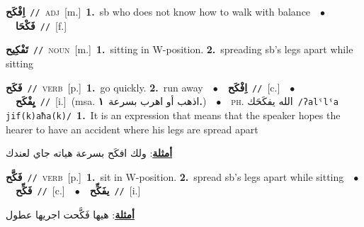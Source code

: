 \documentclass[10pt,a4paper,twoside]{article} %
\begin{document}
\begin{multicols}{2}
{\setlength\topsep{0pt}\textbf{\foreignlanguage{arabic}{اِفْكَح}}\ {\color{gray}\texttt{//}\color{black}}\ \textsc{adj}\ [m.]\ \textbf{1.}~sb who does not know how to walk with balance\ \ $\bullet$\ \ \setlength\topsep{0pt}\textbf{\foreignlanguage{arabic}{فَكْحَا}}\ {\color{gray}\texttt{//}\color{black}}\ [f.]\ } \vspace{2mm}

{\setlength\topsep{0pt}\textbf{\foreignlanguage{arabic}{تَفْكِيح}}\ {\color{gray}\texttt{//}\color{black}}\ \textsc{noun}\ [m.]\ \textbf{1.}~sitting in W-position.  \textbf{2.}~spreading sb's legs apart while sitting\ } \vspace{2mm}

{\setlength\topsep{0pt}\textbf{\foreignlanguage{arabic}{فَكَح}}\ {\color{gray}\texttt{//}\color{black}}\ \textsc{verb}\ [p.]\ \textbf{1.}~go quickly.  \textbf{2.}~run away\ \ $\bullet$\ \ \setlength\topsep{0pt}\textbf{\foreignlanguage{arabic}{اِفْكَح}}\ {\color{gray}\texttt{//}\color{black}}\ [c.]\ \ $\bullet$\ \ \setlength\topsep{0pt}\textbf{\foreignlanguage{arabic}{يِفْكَح}}\ {\color{gray}\texttt{//}\color{black}}\ [i.]\ \color{gray}(msa. \foreignlanguage{arabic}{اذهب أو اهرب بسرعة}~\foreignlanguage{arabic}{\textbf{١.}})\color{black}\ \ $\bullet$\ \ \textsc{ph.} \color{gray} \foreignlanguage{arabic}{الله يفكَحَك}\color{black}\ {\color{gray}\texttt{/{\sffamily ʔalˤlˤa jif(k)aħa(k)}/}\color{black}}\ \textbf{1.}~It is an expression that means that the speaker hopes the hearer to have an accident where his legs are spread apart\  \begin{flushright}\color{gray}\foreignlanguage{arabic}{\textbf{\underline{\foreignlanguage{arabic}{أمثلة}}}: ولك افكَح بسرعة هياته جاي لعندك}\end{flushright}\color{black}} \vspace{2mm}

{\setlength\topsep{0pt}\textbf{\foreignlanguage{arabic}{فَكَّح}}\ {\color{gray}\texttt{//}\color{black}}\ \textsc{verb}\ [p.]\ \textbf{1.}~sit in W-position.  \textbf{2.}~spread sb's legs apart while sitting\ \ $\bullet$\ \ \setlength\topsep{0pt}\textbf{\foreignlanguage{arabic}{فَكِّح}}\ {\color{gray}\texttt{//}\color{black}}\ [c.]\ \ $\bullet$\ \ \setlength\topsep{0pt}\textbf{\foreignlanguage{arabic}{يفَكِّح}}\ {\color{gray}\texttt{//}\color{black}}\ [i.]\  \begin{flushright}\color{gray}\foreignlanguage{arabic}{\textbf{\underline{\foreignlanguage{arabic}{أمثلة}}}: هيها فَكَّحت اجريها عطول}\end{flushright}\color{black}} \vspace{2mm}


\end{multicols}
\end{document}
